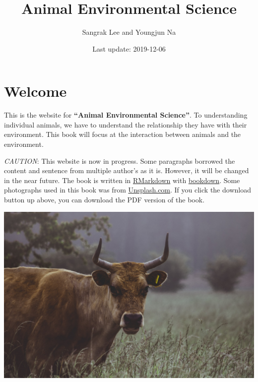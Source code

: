 \documentclass[]{book}
\title{Animal Environmental Science}
\author{Sangrak Lee and Youngjun Na}
\date{Last update: 2019-12-06}
\begin{document}
\maketitle

{
\setcounter{tocdepth}{1}
\tableofcontents
}
\hypertarget{welcome}{%
\chapter*{Welcome}\label{welcome}}

This is the website for \textbf{``Animal Environmental Science''}. To understanding individual animals, we have to understand the relationship they have with their environment. This book will focus at the interaction between animals and the environment.

\emph{CAUTION}: This website is now in progress. Some paragraphs borrowed the content and sentence from multiple author's as it is. However, it will be changed in the near future. The book is written in \href{https://rmarkdown.rstudio.com}{RMarkdown} with \href{https://bookdown.org}{bookdown}. Some photographs used in this book was from \href{https://unsplash.com/}{Unsplash.com}. If you click the download button up above, you can download the PDF version of the book.

\begin{center}\includegraphics[width=1\linewidth]{figures/wild-cattle} \end{center}
\end{document}
